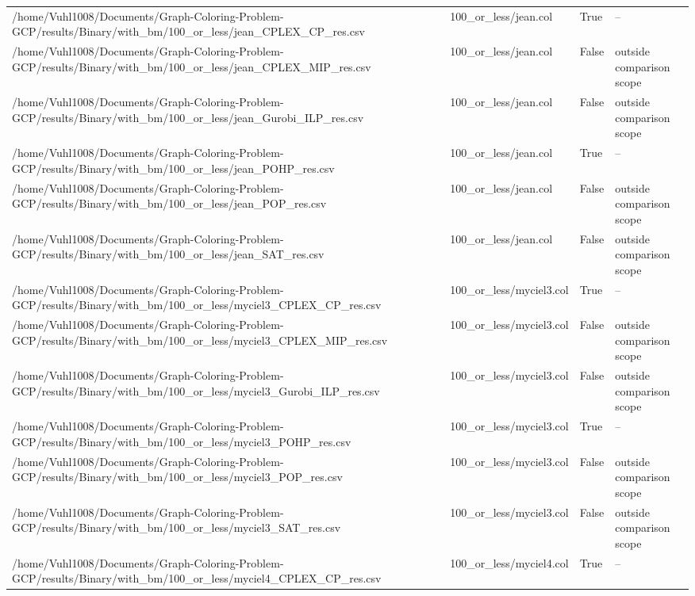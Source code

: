 \begin{table}[htbp]
\begin{tabular}{llll}
/home/Vuhl1008/Documents/Graph-Coloring-Problem-GCP/results/Binary/with\_bm/100\_or\_less/jean\_CPLEX\_CP\_res.csv & 100\_or\_less/jean.col & True & -- \\
/home/Vuhl1008/Documents/Graph-Coloring-Problem-GCP/results/Binary/with\_bm/100\_or\_less/jean\_CPLEX\_MIP\_res.csv & 100\_or\_less/jean.col & False & outside comparison scope \\
/home/Vuhl1008/Documents/Graph-Coloring-Problem-GCP/results/Binary/with\_bm/100\_or\_less/jean\_Gurobi\_ILP\_res.csv & 100\_or\_less/jean.col & False & outside comparison scope \\
/home/Vuhl1008/Documents/Graph-Coloring-Problem-GCP/results/Binary/with\_bm/100\_or\_less/jean\_POHP\_res.csv & 100\_or\_less/jean.col & True & -- \\
/home/Vuhl1008/Documents/Graph-Coloring-Problem-GCP/results/Binary/with\_bm/100\_or\_less/jean\_POP\_res.csv & 100\_or\_less/jean.col & False & outside comparison scope \\
/home/Vuhl1008/Documents/Graph-Coloring-Problem-GCP/results/Binary/with\_bm/100\_or\_less/jean\_SAT\_res.csv & 100\_or\_less/jean.col & False & outside comparison scope \\
/home/Vuhl1008/Documents/Graph-Coloring-Problem-GCP/results/Binary/with\_bm/100\_or\_less/myciel3\_CPLEX\_CP\_res.csv & 100\_or\_less/myciel3.col & True & -- \\
/home/Vuhl1008/Documents/Graph-Coloring-Problem-GCP/results/Binary/with\_bm/100\_or\_less/myciel3\_CPLEX\_MIP\_res.csv & 100\_or\_less/myciel3.col & False & outside comparison scope \\
/home/Vuhl1008/Documents/Graph-Coloring-Problem-GCP/results/Binary/with\_bm/100\_or\_less/myciel3\_Gurobi\_ILP\_res.csv & 100\_or\_less/myciel3.col & False & outside comparison scope \\
/home/Vuhl1008/Documents/Graph-Coloring-Problem-GCP/results/Binary/with\_bm/100\_or\_less/myciel3\_POHP\_res.csv & 100\_or\_less/myciel3.col & True & -- \\
/home/Vuhl1008/Documents/Graph-Coloring-Problem-GCP/results/Binary/with\_bm/100\_or\_less/myciel3\_POP\_res.csv & 100\_or\_less/myciel3.col & False & outside comparison scope \\
/home/Vuhl1008/Documents/Graph-Coloring-Problem-GCP/results/Binary/with\_bm/100\_or\_less/myciel3\_SAT\_res.csv & 100\_or\_less/myciel3.col & False & outside comparison scope \\
/home/Vuhl1008/Documents/Graph-Coloring-Problem-GCP/results/Binary/with\_bm/100\_or\_less/myciel4\_CPLEX\_CP\_res.csv & 100\_or\_less/myciel4.col & True & -- \\

\end{tabular}
\end{table}
